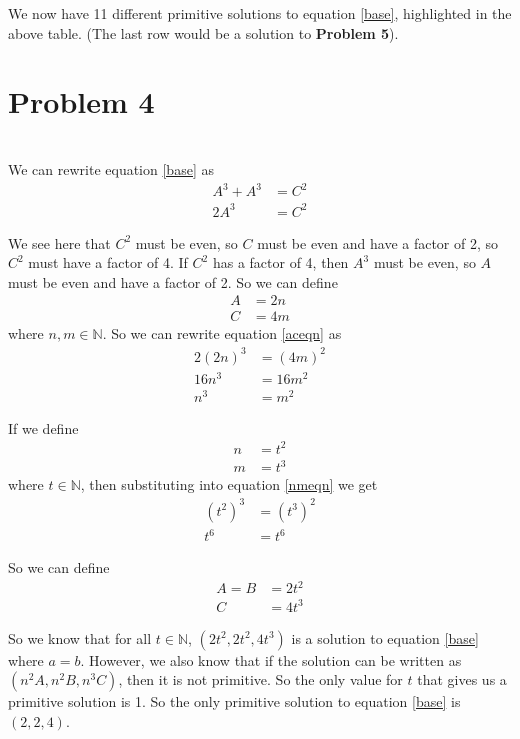 \documentclass[12pt]{article}
\begin{document}
We now have 11 different primitive solutions to equation \ref{base}, highlighted in the above table. (The last row would be a solution to \textbf{Problem 5}).


\newpage
\section*{Problem 4}
\\

We can rewrite equation \ref{base} as
\begin{align}
    \nonumber A^3 + A^3 &= C^2\\
    2A^3 &= C^2 \label{aceqn}
\end{align}

We see here that $C^2$ must be even, so $C$ must be even and have a factor of 2, so $C^2$ must have a factor of 4. If $C^2$ has a factor of 4, then $A^3$ must be even, so $A$ must be even and have a factor of 2. So we can define
\begin{align*}
    A &= 2n \\
    C &= 4m
\end{align*}
where $n, m \in \mathbb{N}$. So we can rewrite equation \ref{aceqn} as
\begin{align}
    \nonumber 2(2n)^3 &= (4m)^2 \\
    \nonumber 16n^3 &= 16m^2 \\
    n^3 &= m^2 \label{nmeqn}
\end{align} 

If we define
\begin{align*}
    n &= t^2 \\
    m &= t^3
\end{align*}
where $t \in \mathbb{N}$, then substituting into equation \ref{nmeqn} we get
\begin{align*}
    (t^2)^3 &= (t^3)^2\\
    t^6 &= t^6
\end{align*}

So we can define
\begin{align*}
    A = B &= 2t^2 \\
    C &= 4t^3
\end{align*}

So we know that for all $t \in \mathbb{N}$, $(2t^2, 2t^2, 4t^3)$ is a solution to equation \ref{base} where $a=b$. However, we also know that if the solution can be written as $(n^2A,n^2B,n^3C)$, then it is not primitive. So the only value for $t$ that gives us a primitive solution is 1. So the only primitive solution to equation \ref{base} is $(2, 2, 4)$.
\end{document}
